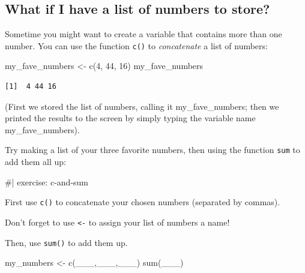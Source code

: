 \documentclass[
  letterpaper,
  DIV=11,
  numbers=noendperiod]{scrreprt}
\newenvironment{Shaded}{\begin{snugshade}}{\end{snugshade}}
\newcommand{\DecValTok}[1]{\textcolor[rgb]{0.68,0.00,0.00}{#1}}
\newcommand{\FunctionTok}[1]{\textcolor[rgb]{0.28,0.35,0.67}{#1}}
\newcommand{\NormalTok}[1]{\textcolor[rgb]{0.00,0.23,0.31}{#1}}
\newcommand{\OtherTok}[1]{\textcolor[rgb]{0.00,0.23,0.31}{#1}}
\theoremstyle{remark}
\begin{document}
\subsection{What if I have a list of numbers to
store?}\label{what-if-i-have-a-list-of-numbers-to-store}

Sometime you might want to create a variable that contains more than one
number. You can use the function \texttt{c()} to \emph{concatenate} a
list of numbers:

\begin{Shaded}
\begin{Highlighting}[]
\NormalTok{my\_fave\_numbers }\OtherTok{\textless{}{-}} \FunctionTok{c}\NormalTok{(}\DecValTok{4}\NormalTok{, }\DecValTok{44}\NormalTok{, }\DecValTok{16}\NormalTok{)}
\NormalTok{my\_fave\_numbers}
\end{Highlighting}
\end{Shaded}

\begin{verbatim}
[1]  4 44 16
\end{verbatim}

(First we stored the list of numbers, calling it my\_fave\_numbers; then
we printed the results to the screen by simply typing the variable name
my\_fave\_numbers).

Try making a list of your three favorite numbers, then using the
function \texttt{sum} to add them all up:

\begin{Shaded}
\begin{Highlighting}[]
\NormalTok{\#| exercise:  c{-}and{-}sum}
\end{Highlighting}
\end{Shaded}

\begin{tcolorbox}[enhanced jigsaw, colbacktitle=quarto-callout-note-color!10!white, opacitybacktitle=0.6, titlerule=0mm, left=2mm, leftrule=.75mm, toptitle=1mm, toprule=.15mm, rightrule=.15mm, title=\textcolor{quarto-callout-note-color}{\faInfo}\hspace{0.5em}{Hint}, colback=white, arc=.35mm, colframe=quarto-callout-note-color-frame, bottomrule=.15mm, breakable, bottomtitle=1mm, opacityback=0, coltitle=black]

First use \texttt{c()} to concatenate your chosen numbers (separated by
commas).

Don't forget to use \texttt{\textless{}-} to assign your list of numbers
a name!

Then, use \texttt{sum()} to add them up.

\begin{Shaded}
\begin{Highlighting}[]
\NormalTok{my\_numbers }\OtherTok{\textless{}{-}} \FunctionTok{c}\NormalTok{(\_\_\_,\_\_\_,\_\_\_)}
\FunctionTok{sum}\NormalTok{(\_\_\_)}
\end{Highlighting}
\end{Shaded}

\end{tcolorbox}
\end{document}
